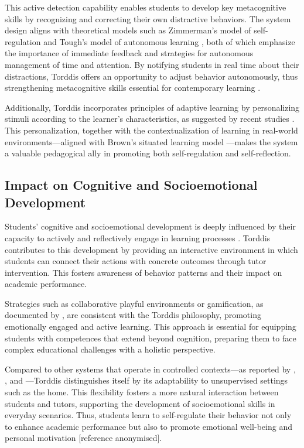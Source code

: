 			This active detection capability enables students to develop key metacognitive skills by recognizing and correcting their own distractive behaviors. The system design aligns with theoretical models such as Zimmerman’s model of self-regulation \citep{Zimmerman2013Self} and Tough’s model of autonomous learning \citep{Tough1985Andragogy}, both of which emphasize the importance of immediate feedback and strategies for autonomous management of time and attention. By notifying students in real time about their distractions, Torddis offers an opportunity to adjust behavior autonomously, thus strengthening metacognitive skills essential for contemporary learning \citep{Ackermans2025Young,Al-Gburi2023}.
			
			Additionally, Torddis incorporates principles of adaptive learning by personalizing stimuli according to the learner’s characteristics, as suggested by recent studies \citep{Dhananjaya2024Digital,Mwambe2022,Sundari2024Transforming}. This personalization, together with the contextualization of learning in real-world environments—aligned with Brown’s situated learning model \citep{Brown1989}—makes the system a valuable pedagogical ally in promoting both self-regulation and self-reflection.
			
		\subsection{Impact on Cognitive and Socioemotional Development}
			Students’ cognitive and socioemotional development is deeply influenced by their capacity to actively and reflectively engage in learning processes \citep{SaezLopez2016Visual,Mohamed2018Implementing,Palioura2025Storytelling}. Torddis contributes to this development by providing an interactive environment in which students can connect their actions with concrete outcomes through tutor intervention. This fosters awareness of behavior patterns and their impact on academic performance.
			
			Strategies such as collaborative playful environments or gamification, as documented by \cite{Echeverria2011AFramework}, are consistent with the Torddis philosophy, promoting emotionally engaged and active learning. This approach is essential for equipping students with competences that extend beyond cognition, preparing them to face complex educational challenges with a holistic perspective.
			
			Compared to other systems that operate in controlled contexts—as reported by \cite{Ackermans2025Young}, \cite{Berrezueta-Guzman2021}, and \cite{Wang2022Empowering}—Torddis distinguishes itself by its adaptability to unsupervised settings such as the home. This flexibility fosters a more natural interaction between students and tutors, supporting the development of socioemotional skills in everyday scenarios. Thus, students learn to self-regulate their behavior not only to enhance academic performance but also to promote emotional well-being and personal motivation [reference anonymised].
			

